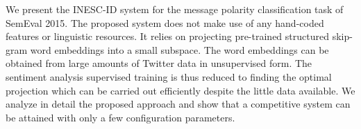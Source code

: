 We present the INESC-ID system for the message polarity classification task of SemEval 2015. The proposed system does not make use of any hand-coded features or linguistic resources. It relies on projecting pre-trained structured skip-gram word embeddings into a small subspace. The word embeddings can be obtained from large amounts of Twitter data in unsupervised form. The sentiment analysis supervised training is thus reduced to finding the optimal projection which can be carried out efficiently despite the little data available. We analyze in detail the proposed approach and show that a competitive system can be attained with only a few configuration parameters.
